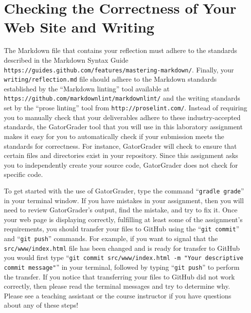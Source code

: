 \documentclass[11pt]{article}
\newcommand{\mainprogramsource}{\lstinline{src/www/index.html}}
\newcommand{\reflection}{\lstinline{writing/reflection.md}}
\newcommand{\gatorgraderstart}{\command{gradle grade}}
\newcommand{\gitcommit}{\command{git commit}}
\newcommand{\gitpush}{\command{git push}}
\newcommand{\gitcommitmainprogram}{\command{git commit src/www/index.html -m "Your
descriptive commit message"}}
\newcommand{\command}[1]{``\lstinline{#1}''}
\newcommand{\url}[1]{\lstinline{#1}}
\newcommand{\step}[1]{``{#1}''}
\begin{document}
\section*{Checking the Correctness of Your Web Site and Writing}

The Markdown file that contains your reflection must adhere to the standards
described in the Markdown Syntax Guide
\url{https://guides.github.com/features/mastering-markdown/}. Finally, your
\reflection{} file should adhere to the Markdown standards established by the
\step{Markdown linting} tool available at
\url{https://github.com/markdownlint/markdownlint/} and the writing standards
set by the \step{prose linting} tool from \url{http://proselint.com/}. Instead
of requiring you to manually check that your deliverables adhere to these
industry-accepted standards, the GatorGrader tool that you will use in this
laboratory assignment makes it easy for you to automatically check if your
submission meets the standards for correctness. For instance, GatorGrader will
check to ensure that certain files and directories exist in your repository.
Since this assignment asks you to independently create your source code,
GatorGrader does not check for specific code.

To get started with the use of GatorGrader, type the command \gatorgraderstart{}
in your terminal window. If you have mistakes in your assignment, then you will
need to review GatorGrader's output, find the mistake, and try to fix it. Once
your web page is displaying correctly, fulfilling at least some of the
assignment's requirements, you should transfer your files to GitHub using the
\gitcommit{} and \gitpush{} commands. For example, if you want to signal that
the \mainprogramsource{} file has been changed and is ready for transfer to
GitHub you would first type \gitcommitmainprogram{} in your terminal, followed
by typing \gitpush{} to perform the transfer.
%
If you notice that transferring your files to GitHub did not work correctly,
then please read the terminal messages and try to determine why.
%
Please see a teaching assistant or the course instructor if you have questions
about any of these steps!
\end{document}
